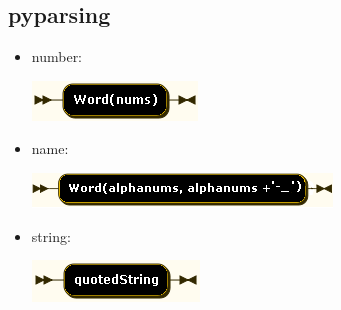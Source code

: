 \subsection{pyparsing}
\begin{itemize}
\item number:

\includegraphics[scale=0.66]{images/grammar/number.png}

\item name:

\includegraphics[scale=0.66]{images/grammar/name.png}

\item string:

\includegraphics[scale=0.66]{images/grammar/string.png}
\end{itemize}

